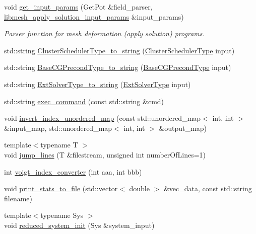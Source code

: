 \begin{DoxyCompactItemize}
void \hyperlink{namespacecarl_a3e93400b1873e44916865a36944134fa}{get\+\_\+input\+\_\+params} (Get\+Pot \&field\+\_\+parser, \hyperlink{structcarl_1_1libmesh__apply__solution__input__params}{libmesh\+\_\+apply\+\_\+solution\+\_\+input\+\_\+params} \&input\+\_\+params)
\begin{DoxyCompactList}\small\item\em Parser function for mesh deformation (apply solution) programs. \end{DoxyCompactList}\item 
std\+::string \hyperlink{namespacecarl_a855a8c682ef0ee0a35f987e051d2bbf2}{Cluster\+Scheduler\+Type\+\_\+to\+\_\+string} (\hyperlink{namespacecarl_a67066fdf35a0c326f5147098c0cf45d1}{Cluster\+Scheduler\+Type} input)
\item 
std\+::string \hyperlink{namespacecarl_ae4298594b456c7d030d5be6868d6dc63}{Base\+C\+G\+Precond\+Type\+\_\+to\+\_\+string} (\hyperlink{namespacecarl_ad52f21755b51ffa926038b59ae194ea8}{Base\+C\+G\+Precond\+Type} input)
\item 
std\+::string \hyperlink{namespacecarl_a2df653606e38410b38a938470c3b7fd3}{Ext\+Solver\+Type\+\_\+to\+\_\+string} (\hyperlink{namespacecarl_a384c8e69965cba9e6e52667c8cefff08}{Ext\+Solver\+Type} input)
\item 
std\+::string \hyperlink{namespacecarl_a54249fee021b3d53e1a7ae7208292437}{exec\+\_\+command} (const std\+::string \&cmd)
\item 
void \hyperlink{namespacecarl_a543276bdc1b659a9373b4255892b7174}{invert\+\_\+index\+\_\+unordered\+\_\+map} (const std\+::unordered\+\_\+map$<$ int, int $>$ \&input\+\_\+map, std\+::unordered\+\_\+map$<$ int, int $>$ \&output\+\_\+map)
\item 
{\footnotesize template$<$typename T $>$ }\\void \hyperlink{namespacecarl_a48bf9a2c641710d703991550fc480884}{jump\+\_\+lines} (T \&filestream, unsigned int number\+Of\+Lines=1)
\item 
int \hyperlink{namespacecarl_a3e28e30c4315c39fbddd46af79018d51}{voigt\+\_\+index\+\_\+converter} (int aaa, int bbb)
\item 
void \hyperlink{namespacecarl_a87ce5fcb102a26f69dbef740667eb08b}{print\+\_\+stats\+\_\+to\+\_\+file} (std\+::vector$<$ double $>$ \&vec\+\_\+data, const std\+::string filename)
\item 
{\footnotesize template$<$typename Sys $>$ }\\void \hyperlink{namespacecarl_a8b8d75f4ab54390f3e7c607ed4f0cf19}{reduced\+\_\+system\+\_\+init} (Sys \&system\+\_\+input)

\end{DoxyCompactItemize}
